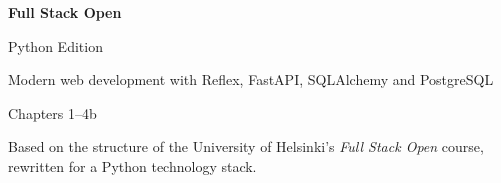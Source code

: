 




\frontmatter

\begin{titlepage}
\centering
\vspace*{5cm}
{\sffamily\bfseries\color{fsoblue}\fontsize{38}{44}\selectfont Full Stack Open\par}
\vspace{0.4cm}
{\sffamily\color{fsoblue}\LARGE Python Edition\par}
\vspace{1.5cm}
{\large Modern web development with Reflex, FastAPI, SQLAlchemy and PostgreSQL\par}
\vspace{0.6cm}
{\normalsize Chapters 1--4b\par}
\vfill
{\small Based on the structure of the University of Helsinki's \emph{Full Stack Open} course,\\ rewritten for a Python technology stack.\par}
\end{titlepage}

\tableofcontents



\mainmatter







